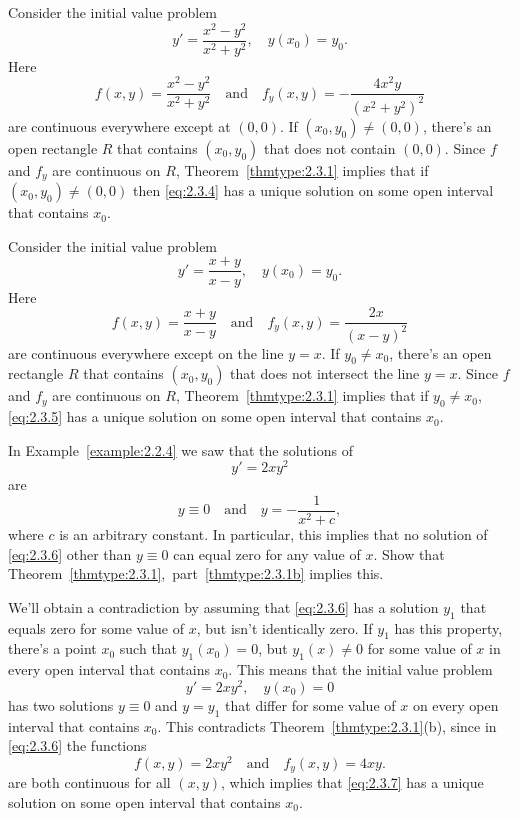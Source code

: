 \documentclass{ximera}
\begin{document}
\begin{example}\label{example:2.3.2}
Consider  the initial value problem
\begin{equation} \label{eq:2.3.4}
y'=\frac{x^2-y^2}{x^2+y^2}, \quad y(x_0)=y_0.
\end{equation}
Here
$$
f(x,y)  =  \frac{x^2-y^2}{x^2+y^2} \quad\mbox{and}\quad 
f_y(x,y)  =  -\frac{4x^2y}{(x^2+y^2)^2}
$$
are continuous everywhere except at $(0,0)$. If $(x_0,y_0)
\neq(0,0)$, there's an open rectangle $R$ that contains
$(x_0,y_0)$ that does not contain $(0,0)$. Since $f$ and $f_y$ are
continuous on $R$, Theorem~\ref{thmtype:2.3.1} implies that if
$(x_0,y_0)\neq(0,0)$ then
\eqref{eq:2.3.4}
has a unique solution on some open interval that contains $x_0$.
\end{example}

\begin{example}\label{example:2.3.3}
Consider the initial value problem
\begin{equation} \label{eq:2.3.5}
y'=\frac{x+y}{x-y},\quad y(x_0)=y_0.
\end{equation}
Here
$$
f(x,y)  =  \frac{x+y}{x-y} \quad\mbox{and}\quad 
f_y(x,y)  =  \frac{2x}{(x-y)^2}
$$
are continuous everywhere except on the line $y=x$. If $y_0\neq x_0$,
there's an open rectangle $R$ that contains $(x_0,y_0)$ that
does not intersect the line $y=x$. Since $f$ and $f_y$ are continuous
on $R$, Theorem~\ref{thmtype:2.3.1} implies that if $y_0\neq x_0$,
\eqref{eq:2.3.5} has a unique solution on some open interval that contains
$x_0$.
\end{example}

\begin{example}\label{example:2.3.4}
In Example~\ref{example:2.2.4} we saw that the
solutions of
\begin{equation} \label{eq:2.3.6}
y'=2xy^2
\end{equation}
are
 $$
y\equiv0 \quad\mbox{and}\quad  y=-\frac{1}{x^2+c},
$$
where $c$ is an arbitrary constant. In particular, this implies that
no solution of \eqref{eq:2.3.6} other than $y\equiv0$ can equal zero for
any value of $x$. Show that Theorem~\ref{thmtype:2.3.1},~part~\ref{thmtype:2.3.1b} implies
this.

\begin{explanation}
We'll obtain a contradiction
by assuming that \eqref{eq:2.3.6} has a solution $y_1$ that equals
zero for some value of $x$, but isn't  identically zero. If $y_1$
has this property,  there's a point $x_0$ such that $y_1(x_0)=0$,
but $y_1(x)\neq0$ for some value of $x$ in every open interval that contains
$x_0$. This means that the initial value problem
\begin{equation} \label{eq:2.3.7}
y'=2xy^2,\quad y(x_0)=0
\end{equation}
has two solutions $y\equiv0$ and $y=y_1$ that differ for some value of
$x$ on every open interval that contains $x_0$. This contradicts
Theorem~\ref{thmtype:2.3.1}(b), since in \eqref{eq:2.3.6} the functions
$$
f(x,y)=2xy^2  \quad\mbox{and}\quad  f_y(x,y)= 4xy.
$$
are both continuous
for all $(x,y)$, which implies that \eqref{eq:2.3.7} has a unique
solution on some open interval that contains $x_0$.
\end{explanation}
\end{example}
\end{document}
